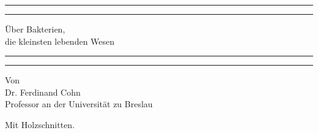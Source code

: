 \documentclass[a4paper, 11pt, oneside, english]{article}
\begin{document}
\begin{titlepage} %
	\centering %
	\scshape %

	
	\rule{\textwidth}{1.6pt}\vspace*{-\baselineskip}\vspace*{2pt} %
	\rule{\textwidth}{0.4pt} %
	
	\vspace{0.75\baselineskip} %

        {\LARGE Über Bakterien, \\\large die kleinsten lebenden Wesen} %
	
	\vspace{0.75\baselineskip} %
	
	\rule{\textwidth}{0.4pt}\vspace*{-\baselineskip}\vspace{3.2pt} %
	\rule{\textwidth}{1.6pt} %
	
	\vspace{1\baselineskip} %
	
	
	{Von \\\Large Dr. Ferdinand Cohn\\\large Professor an der Universität zu Breslau} %
	
	\vspace*{1\baselineskip} %

        {\normalsize Mit Holzschnitten.}

         \vspace*{1\baselineskip} %

	
		
		

\end{titlepage}
\end{document}
